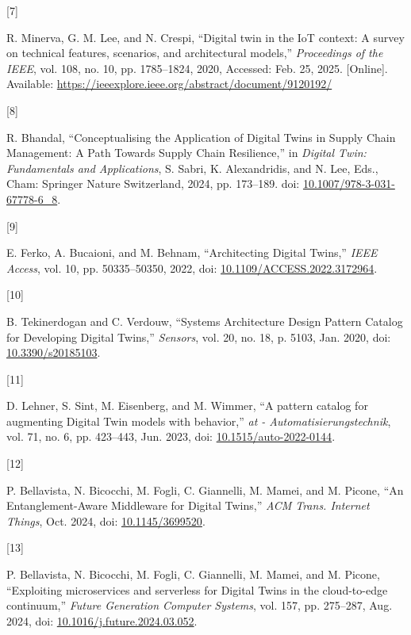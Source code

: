 \documentclass[
  12pt,
  a4paper,
]{article}
\newlength{\cslhangindent}
\newlength{\csllabelwidth}
\newenvironment{CSLReferences}[2] %
 {\begin{list}{}{%
  \setlength{\itemindent}{0pt}
  \setlength{\leftmargin}{0pt}
  \setlength{\parsep}{0pt}
  \ifodd #1
   \setlength{\leftmargin}{\cslhangindent}
   \setlength{\itemindent}{-1\cslhangindent}
  \fi
  \setlength{\itemsep}{#2\baselineskip}}}
 {\end{list}}
\newcommand{\CSLLeftMargin}[1]{\parbox[t]{\csllabelwidth}{\strut#1\strut}}
\newcommand{\CSLRightInline}[1]{\parbox[t]{\linewidth - \csllabelwidth}{\strut#1\strut}}
\begin{document}
\begin{CSLReferences}{0}{0}
\CSLLeftMargin{{[}7{]} }%
\CSLRightInline{R. Minerva, G. M. Lee, and N. Crespi, {``Digital twin in
the {IoT} context: {A} survey on technical features, scenarios, and
architectural models,''} \emph{Proceedings of the IEEE}, vol. 108, no.
10, pp. 1785--1824, 2020, Accessed: Feb. 25, 2025. {[}Online{]}.
Available: \url{https://ieeexplore.ieee.org/abstract/document/9120192/}}

\CSLLeftMargin{{[}8{]} }%
\CSLRightInline{R. Bhandal, {``Conceptualising the {Application} of
{Digital} {Twins} in {Supply} {Chain} {Management}: {A} {Path} {Towards}
{Supply} {Chain} {Resilience},''} in \emph{Digital {Twin}:
{Fundamentals} and {Applications}}, S. Sabri, K. Alexandridis, and N.
Lee, Eds., Cham: Springer Nature Switzerland, 2024, pp. 173--189. doi:
\href{https://doi.org/10.1007/978-3-031-67778-6_8}{10.1007/978-3-031-67778-6\_8}.}

\CSLLeftMargin{{[}9{]} }%
\CSLRightInline{E. Ferko, A. Bucaioni, and M. Behnam, {``Architecting
{Digital} {Twins},''} \emph{IEEE Access}, vol. 10, pp. 50335--50350,
2022, doi:
\href{https://doi.org/10.1109/ACCESS.2022.3172964}{10.1109/ACCESS.2022.3172964}.}

\CSLLeftMargin{{[}10{]} }%
\CSLRightInline{B. Tekinerdogan and C. Verdouw, {``Systems
{Architecture} {Design} {Pattern} {Catalog} for {Developing} {Digital}
{Twins},''} \emph{Sensors}, vol. 20, no. 18, p. 5103, Jan. 2020, doi:
\href{https://doi.org/10.3390/s20185103}{10.3390/s20185103}.}

\CSLLeftMargin{{[}11{]} }%
\CSLRightInline{D. Lehner, S. Sint, M. Eisenberg, and M. Wimmer, {``A
pattern catalog for augmenting {Digital} {Twin} models with behavior,''}
\emph{at - Automatisierungstechnik}, vol. 71, no. 6, pp. 423--443, Jun.
2023, doi:
\href{https://doi.org/10.1515/auto-2022-0144}{10.1515/auto-2022-0144}.}

\CSLLeftMargin{{[}12{]} }%
\CSLRightInline{P. Bellavista, N. Bicocchi, M. Fogli, C. Giannelli, M.
Mamei, and M. Picone, {``An {Entanglement}-{Aware} {Middleware} for
{Digital} {Twins},''} \emph{ACM Trans. Internet Things}, Oct. 2024, doi:
\href{https://doi.org/10.1145/3699520}{10.1145/3699520}.}

\CSLLeftMargin{{[}13{]} }%
\CSLRightInline{P. Bellavista, N. Bicocchi, M. Fogli, C. Giannelli, M.
Mamei, and M. Picone, {``Exploiting microservices and serverless for
{Digital} {Twins} in the cloud-to-edge continuum,''} \emph{Future
Generation Computer Systems}, vol. 157, pp. 275--287, Aug. 2024, doi:
\href{https://doi.org/10.1016/j.future.2024.03.052}{10.1016/j.future.2024.03.052}.}


\end{CSLReferences}
\end{document}
